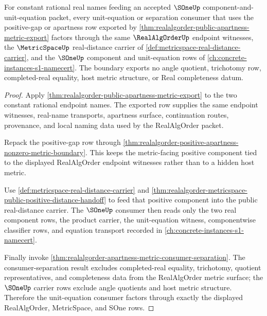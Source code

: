 \begin{theorem}
\label{thm:realalgorder-sone-unit-equation-apartness-boundary}
For constant rational real names feeding an accepted $\SOneUp$
component-and-unit-equation packet, every unit-equation or separation consumer
that uses the positive-gap or apartness row exported by
\autoref{thm:realalgorder-public-apartness-metric-export} factors through the
same $\RealAlgOrderUp$ endpoint witnesses, the $\MetricSpaceUp$ real-distance
carrier of \autoref{def:metricspace-real-distance-carrier}, and the $\SOneUp$
component and unit-equation rows of
\autoref{ch:concrete-instances-s1-namecert}. The boundary exports no angle
quotient, trichotomy row, completed-real equality, host metric structure, or
Real completeness datum.
\end{theorem}
\begin{proof}
Apply \autoref{thm:realalgorder-public-apartness-metric-export} to the two
constant rational endpoint names. The exported row supplies the same endpoint
witnesses, real-name transports, apartness surface, continuation routes,
provenance, and local naming data used by the RealAlgOrder packet.

Repack the positive-gap row through
\autoref{thm:realalgorder-positive-apartness-nonzero-metric-boundary}. This
keeps the metric-facing positive component tied to the displayed RealAlgOrder
endpoint witnesses rather than to a hidden host metric.

Use \autoref{def:metricspace-real-distance-carrier} and
\autoref{thm:realalgorder-metricspace-public-positive-distance-handoff} to feed
that positive component into the public real-distance carrier. The $\SOneUp$
consumer then reads only the two real component rows, the product carrier, the
unit-equation witness, componentwise classifier rows, and equation transport
recorded in \autoref{ch:concrete-instances-s1-namecert}.

Finally invoke
\autoref{thm:realalgorder-apartness-metric-consumer-separation}. The
consumer-separation result excludes completed-real equality, trichotomy,
quotient representatives, and completeness data from the RealAlgOrder metric
surface; the $\SOneUp$ carrier rows exclude angle quotients and host metric
structure. Therefore the unit-equation consumer factors through exactly the
displayed RealAlgOrder, MetricSpace, and SOne rows.
\end{proof}

